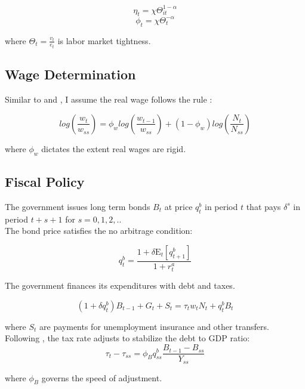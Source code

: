 \documentclass[\econtexRoot/HAFiscal]{subfiles}
\begin{document}
$$\eta_{t} = \chi \Theta_{it}^{1-\alpha} $$
$$ \phi_{t} = \chi \Theta_{t}^{-\alpha} $$ 
\vspace{.1cm}

where $\Theta_{t} = \frac{v_{t}}{e_{t}}$ is labor market tightness.



\subsection{Wage Determination }


Similar to \cite{Gornemann2021} and \cite{Blanchard2010}, I assume the real wage follows the rule :

$$log\left(\frac{w_{t}}{w_{ss}}\right)  = \phi_w log\left( \frac{ w_{t-1}}{ w_{ss}} \right) +   (1 - \phi_w) log\left( \frac{N_{t}}{N_{ss}}\right)$$
\vspace{.2cm}

where $\phi_w$ dictates the extent real wages are rigid. 



\subsection{Fiscal Policy}

The government issues long term bonds $B_{t}$ at price $q^{b}_{t}$ in period $t$ that pays $\delta^{s}$ in period $t+s+1$ for $s = 0,1,2, ..$ \\

The bond price satisfies the no arbitrage condition:

$$q^{b}_{t} = \frac{ 1  + \delta \mathrm{E}_{t}[q^{b}_{t+1}]}{1+r^{a}_{t}}$$ 


The government finances its expenditures with debt and taxes. 

$$ (1 + \delta q^{b}_{t})B_{t-1} + G_{t}  + S_{t} = \tau_{t} w_{t} N_{t}+ q^{b}_{t}B_{t}$$
\vspace{.4cm}

where $ S_{t}$ are payments for unemployment insurance and other transfers. \\

Following \cite{AuclertMicroJumpsMacroHumps}, the tax rate adjusts to stabilize the debt to GDP ratio:\\
$$ \tau_{t} - \tau_{ss} = \phi_{B} q^{b}_{ss} \frac{B_{t-1} - B_{ss} }{Y_{ss}}$$

\vspace{.4cm}
where $\phi_{B}$ governs the speed of adjustment. 
\end{document}
